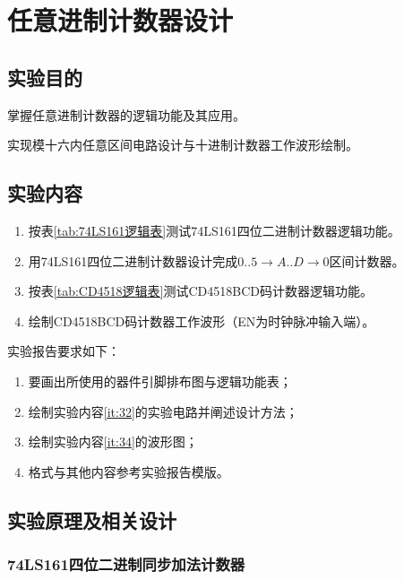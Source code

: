 \documentclass{ctexrep}
\begin{document}
\chapter{任意进制计数器设计}%
\label{cha:任意进制计数器设计}

\section{实验目的}%
\label{sec:实验目的\arabic{chapter}}

掌握任意进制计数器的逻辑功能及其应用。

实现模十六内任意区间电路设计与十进制计数器工作波形绘制。

\section{实验内容}%
\label{sec:实验内容\arabic{chapter}}

\begin{enumerate}
	\item 按表\ref{tab:74LS161逻辑表}测试74LS161四位二进制计数器逻辑功能。
	\item \label{it:32}用74LS161四位二进制计数器设计完成$ 0..5\rightarrow A..D\rightarrow 0 $区间计数器。
	\item 按表\ref{tab:CD4518逻辑表}测试CD4518BCD码计数器逻辑功能。
	\item \label{it:34}绘制CD4518BCD码计数器工作波形（EN为时钟脉冲输入端）。
\end{enumerate}

实验报告要求如下：

\begin{enumerate}
	\item 要画出所使用的器件引脚排布图与逻辑功能表；
	\item 绘制实验内容\ref{it:32}的实验电路并阐述设计方法；
	\item 绘制实验内容\ref{it:34}的波形图；
	\item 格式与其他内容参考实验报告模版。
\end{enumerate}

\section{实验原理及相关设计}%
\label{sec:实验原理及相关设计\arabic{chapter}}

\subsection{74LS161四位二进制同步加法计数器}%
\label{sub:74LS161四位二进制同步加法计数器}
\end{document}
